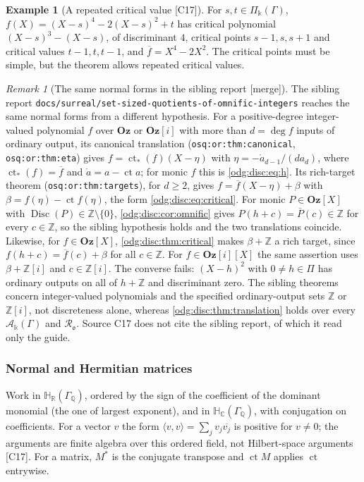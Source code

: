 \documentclass[11pt,oneside]{article}
\numberwithin{equation}{section}
\theoremstyle{definition}
\newtheorem{example}[example]{Example}
\theoremstyle{remark}
\newtheorem{remark}[remark]{Remark}
\newcommand{\Oz}{\mathbf{Oz}}
\newcommand{\Z}{\mathbb Z}
\newcommand{\Q}{\mathbb Q}
\newcommand{\R}{\mathbb R}
\newcommand{\C}{\mathbb C}
\newcommand{\ct}{\operatorname{ct}}
\newcommand{\src}[1]{\textup{\textsf{\small[#1]}}}
\newcommand{\mergetag}{\textup{\textsf{\small[merge]}}}
\newcommand{\replabel}[1]{\nolinkurl{#1}}
\newcommand{\fn}[1]{\nolinkurl{#1}}
\newcommand{\Og}{\Oz[i]}
\newcommand{\crA}{\mathcal A_\Bbbk(\Gamma)}
\newcommand{\crP}{\Pi_\Bbbk(\Gamma)}
\newcommand{\Disc}{\operatorname{Disc}}
\begin{document}
\begin{example}[A repeated critical value \src{C17}]\label{odg:disc:ex:critical}
For $s,t\in\crP$, $f(X)=(X-s)^4-2(X-s)^2+t$ has critical polynomial $(X-s)^3-(X-s)$, of
discriminant $4$, critical points $s-1,s,s+1$ and critical values $t-1,t,t-1$, and
$\overline f=X^4-2X^2$. The critical points must be simple, but the theorem allows
repeated critical values.
\end{example}

\begin{remark}[The same normal forms in the sibling report \mergetag]\label{odg:disc:rem:osq}
The sibling report \fn{docs/surreal/set-sized-quotients-of-omnific-integers} reaches the
same normal forms from a different hypothesis. For a positive-degree integer-valued polynomial $f$ over
$\Oz$ or $\Og$ with more than $d=\deg f$ inputs of ordinary output, its canonical
translation (\replabel{osq:or:thm:canonical}, \replabel{osq:or:thm:eta}) gives
$f=\ct_*(f)(X-\eta)$ with $\eta=-\mathring a_{d-1}/(da_d)$, where $\ct_*(f)=\overline f$ and
$\mathring a=a-\ct a$; for monic $f$ this is \eqref{odg:disc:eq:h}. Its rich-target theorem
(\replabel{osq:or:thm:targets}), for $d\ge2$, gives $f=\overline f(X-\eta)+\beta$ with
$\beta=f(\eta)-\ct f(\eta)$, the form \eqref{odg:disc:eq:critical}. For monic $P\in\Oz[X]$
with $\Disc(P)\in\Z\setminus\{0\}$, \cref{odg:disc:cor:omnific} gives
$P(h+c)=\overline P(c)\in\Z$ for every $c\in\Z$, so the sibling hypothesis holds and the two
translations coincide. Likewise, for $f\in\Oz[X]$, \cref{odg:disc:thm:critical} makes
$\beta+\Z$ a rich target, since $f(h+c)=\overline f(c)+\beta$ for all $c\in\Z$.
For $f\in\Og[X]$ the same assertion uses $\beta+\Z[i]$ and $c\in\Z[i]$.
The converse fails: $(X-h)^2$ with $0\ne h\in\Pi$ has ordinary outputs on all of $h+\Z$ and
discriminant zero. The sibling theorems concern integer-valued polynomials and the
specified ordinary-output sets $\Z$ or $\Z[i]$, not discreteness alone, whereas
\cref{odg:disc:thm:translation} holds over every $\crA$ and $\mathcal R_{\mathfrak o}$.
Source C17 does not cite the sibling report, of which it read only the guide.
\end{remark}

\subsubsection{Normal and Hermitian matrices}\label{odg:disc:sub:matrix}

Work in $\mathbb H_\R(\Gamma_\Q)$, ordered by the sign of the coefficient of the dominant
monomial (the one of largest exponent), and in $\mathbb H_\C(\Gamma_\Q)$, with conjugation on
coefficients. For a vector $v$ the form $\langle v,v\rangle=\sum_jv_j\overline{v_j}$ is
positive for $v\ne0$; the arguments are finite algebra over this ordered field, not
Hilbert-space arguments \src{C17}. For a matrix, $M^*$ is the conjugate transpose and
$\ct M$ applies $\ct$ entrywise.
\end{document}
